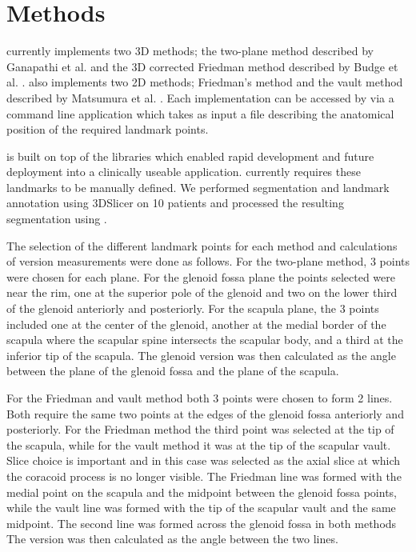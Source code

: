 \section{Methods}
\label{sec:methods}
\sksglenoid currently implements two 3D methods; the two-plane method described by Ganapathi et al. \cite{PMID:20933439} and the 3D corrected 
Friedman method described by Budge et al. \cite{BUDGE2011577}. \sksglenoid also implements two
2D methods; Friedman's method \cite{PMID:1522089} and the vault method described by Matsumura et al. \cite{PMID:24618285}. Each implementation can be accessed by via a command line application which takes as 
input a file describing the anatomical position of the required landmark points. 

\sksglenoid is built on top of the \sksurgery \cite{PMID:32436132} libraries which enabled 
rapid development and future deployment into a clinically useable application.  
\sksglenoid currently requires these landmarks to be manually defined. We performed segmentation 
and landmark annotation using 3DSlicer \cite{Kikinis2014} on 10 patients and processed
the resulting 
segmentation using \sksglenoidns.

The selection of the different landmark points for each method and calculations of version measurements were done as follows. For the two-plane method, 3 points were chosen for each plane. For the glenoid fossa plane the points selected were near the rim, one at the superior pole of the glenoid and two on the lower third of the glenoid anteriorly and posteriorly.  For the scapula plane, the 3 points included one at the center of the glenoid, another at the medial border of the scapula where the scapular spine intersects the scapular body, and a third at the inferior tip of the scapula. The glenoid version was then calculated as the angle between the plane of the glenoid fossa and the plane of the scapula. 

For the Friedman and vault method both 3 points were chosen to form 2 lines. Both require the same two points at the edges of the glenoid fossa anteriorly and posteriorly. For the Friedman method the third point was selected at the tip of the scapula, while for the vault method it was at the tip of the scapular vault. Slice choice is important and in this case was selected as the axial slice at which the coracoid process is no longer visible. The Friedman line was formed with the medial point on the scapula and the midpoint between the glenoid fossa points, while the vault line was formed with the tip of the scapular vault and the same midpoint. The second line was formed across the glenoid fossa in both methods The version was then calculated as the angle between the two lines.

